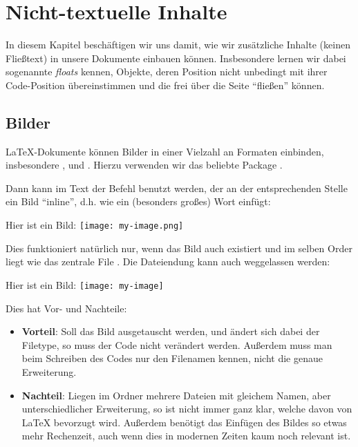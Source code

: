 \chapter{Nicht-textuelle Inhalte}
In diesem Kapitel beschäftigen wir uns damit, wie wir zusätzliche Inhalte (keinen Fließtext) in unsere Dokumente einbauen können.
Insbesondere lernen wir dabei sogenannte \emph{floats} kennen, Objekte, deren Position nicht unbedingt mit ihrer Code-Position übereinstimmen und die frei über die Seite \enquote{fließen} können.

\section{Bilder}\label{sec:bilder}
\LaTeX -Dokumente können Bilder in einer Vielzahl an Formaten einbinden, insbesondere ,  und .
Hierzu verwenden wir das beliebte Package .
\begin{latexlisting}
	\usepackage{graphicx}
\end{latexlisting}
Dann kann im Text der Befehl  benutzt werden, der an der entsprechenden Stelle ein Bild \enquote{inline}, d.h. wie ein (besonders großes) Wort einfügt:
\begin{latexlisting}
	Hier ist ein Bild:
	\texttt{[image: my-image.png]}
\end{latexlisting}
Dies funktioniert natürlich nur, wenn das Bild  auch existiert und im selben Order liegt wie das zentrale File .
Die Dateiendung  kann auch weggelassen werden:
\begin{latexlisting}
	Hier ist ein Bild:
	\texttt{[image: my-image]}
\end{latexlisting}
Dies hat Vor- und Nachteile:
\begin{itemize}
	\item \textbf{Vorteil}: Soll das Bild ausgetauscht werden, und ändert sich dabei der Filetype, so muss der Code nicht verändert werden.
	Außerdem muss man beim Schreiben des Codes nur den Filenamen kennen, nicht die genaue Erweiterung.
	\item \textbf{Nachteil}: Liegen im Ordner mehrere Dateien mit gleichem Namen, aber unterschiedlicher Erweiterung, so ist nicht immer ganz klar, welche davon von \LaTeX{} bevorzugt wird.
	Außerdem benötigt das Einfügen des Bildes so etwas mehr Rechenzeit, auch wenn dies in modernen Zeiten kaum noch relevant ist.
\end{itemize}
